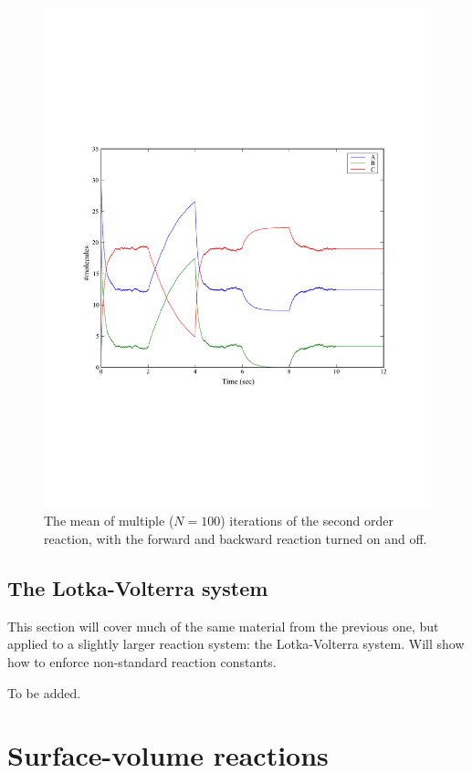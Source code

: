 \documentclass[a4paper,12pt]{book}
\begin{document}
\begin{figure}
\centering
\includegraphics[width=13cm]{secondorderreaction08.pdf}
\caption{The mean of multiple ($N=100$) iterations of the second order reaction, with the forward and backward reaction turned on and off.}
\label{fig:secondorderreaction08}
\end{figure}

\section{The Lotka-Volterra system}

This section will cover much of the same material from the previous one, but applied to a slightly larger reaction system: the Lotka-Volterra system. Will show how to enforce non-standard reaction constants.

To be added.

\chapter{Surface-volume reactions}
\end{document}
